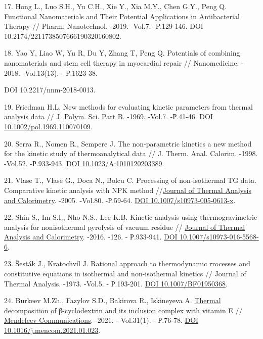 17. Hong L., Luo S.H., Yu C.H., Xie Y., Xia M.Y., Chen G.Y., Peng Q.
Functional Nanomaterials and Their Potential Applications in
Antibacterial Therapy // Pharm. Nanotechnol. -2019. -Vol.7. -P.129-146.
DOI 10.2174/2211738507666190320160802.~

18. Yao Y, Liao W, Yu R, Du Y, Zhang T, Peng Q. Potentials of combining
nanomaterials and stem cell therapy in myocardial repair //
Nanomedicine. - 2018. -Vol.13(13). - P.1623-38.

DOI 10.2217/nnm-2018-0013.

19. Friedman H.L. New methods for evaluating kinetic parameters from
thermal analysis data // J. Polym. Sci. Part B. -1969. -Vol.7. -Р.41-46.
\href{https://doi.org/10.1002/pol.1969.110070109}{DOI
10.1002/pol.1969.110070109}.

20. Serra R., Nomen R., Sempere J. The non-parametric kinetics a new
method for the kinetic study of thermoanalytical data // J. Therm. Anal.
Calorim. -1998. -Vol.52. -Р.933-943.
\href{https://doi.org/10.1023/A:1010120203389}{DOI
10.1023/A:1010120203389}.

21. Vlase T., Vlase G., Doca N., Bolcu C. Processing of non-isothermal
TG data. Comparative kinetic analysis with NPK method
//\href{https://link.springer.com/journal/10973}{Journal of Thermal
Analysis and Calorimetry}. -2005. -Vol.80. -Р.59-64.
\href{https://doi.org/10.1007/s10973-005-0613-x}{DOI
10.1007/s10973-005-0613-x}.

22. Shin S., Im S.I., Nho N.S., Lee K.B. Kinetic analysis using
thermogravimetric analysis for nonisothermal pyrolysis of vacuum residue
// \href{https://link.springer.com/journal/10973}{Journal of Thermal
Analysis and Calorimetry}. -2016. -126. - Р.933-941.
\href{https://doi.org/10.1007/s10973-016-5568-6}{DOI
10.1007/s10973-016-5568-6}.

23. Šesták J., Kratochvíl J. Rational approach to thermodynamic
rrocesses and constitutive equations in isothermal and non-isothermal
kinetics // Journal of Thermal Analysis. -1973. -Vol.5. - Р.193-201.
\href{https://doi.org/10.1007/BF01950368}{DOI 10.1007/BF01950368}.

24. Burkeev M.Zh., Fazylov S.D., Bakirova R., Iskineyeva A.
\href{https://www.sciencedirect.com/science/article/pii/S0959943621000237}{Thermal
decomposition of β-cyclodextrin and its inclusion complex with vitamin
E} //
\href{https://www.sciencedirect.com/science/journal/09599436}{Mendeleev
Communications}. -2021. - Vol.31(1). - Р.76-78.
\href{https://doi.org/10.1016/j.mencom.2021.01.023}{DOI
10.1016/j.mencom.2021.01.023}.


